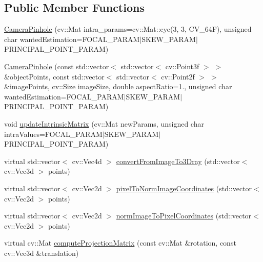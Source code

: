 \subsection*{Public Member Functions}
\begin{DoxyCompactItemize}
\item 
\hyperlink{class_opencv_sf_m_1_1_camera_pinhole_a7951c403bff3a75b6a2decdfa8b685bc}{CameraPinhole} (cv::Mat intra\_\-params=cv::Mat::eye(3, 3, CV\_\-64F), unsigned char wantedEstimation=FOCAL\_\-PARAM$|$SKEW\_\-PARAM$|$PRINCIPAL\_\-POINT\_\-PARAM)
\item 
\hyperlink{class_opencv_sf_m_1_1_camera_pinhole_a942058d75d7c48a65df9a3386f5a6586}{CameraPinhole} (const std::vector$<$ std::vector$<$ cv::Point3f $>$ $>$ \&objectPoints, const std::vector$<$ std::vector$<$ cv::Point2f $>$ $>$ \&imagePoints, cv::Size imageSize, double aspectRatio=1., unsigned char wantedEstimation=FOCAL\_\-PARAM$|$SKEW\_\-PARAM$|$PRINCIPAL\_\-POINT\_\-PARAM)
\item 
void \hyperlink{class_opencv_sf_m_1_1_camera_pinhole_aeecb985ac673ca4d8658ebdbca291dd0}{updateIntrinsicMatrix} (cv::Mat newParams, unsigned char intraValues=FOCAL\_\-PARAM$|$SKEW\_\-PARAM$|$PRINCIPAL\_\-POINT\_\-PARAM)
\item 
virtual std::vector$<$ cv::Vec4d $>$ \hyperlink{class_opencv_sf_m_1_1_camera_pinhole_a694530f3c345a961bad11c28a68703ee}{convertFromImageTo3Dray} (std::vector$<$ cv::Vec3d $>$ points)
\item 
virtual std::vector$<$ cv::Vec2d $>$ \hyperlink{class_opencv_sf_m_1_1_camera_pinhole_ac289202ffff97def7c6287cfb3e3040d}{pixelToNormImageCoordinates} (std::vector$<$ cv::Vec2d $>$ points)
\item 
virtual std::vector$<$ cv::Vec2d $>$ \hyperlink{class_opencv_sf_m_1_1_camera_pinhole_aa844cae56eaa43784b3420bcddaacdd6}{normImageToPixelCoordinates} (std::vector$<$ cv::Vec2d $>$ points)
\item 
virtual cv::Mat \hyperlink{class_opencv_sf_m_1_1_camera_pinhole_ad42158ee2722c73c6935a4744c152026}{computeProjectionMatrix} (const cv::Mat \&rotation, const cv::Vec3d \&translation)
\end{DoxyCompactItemize}
